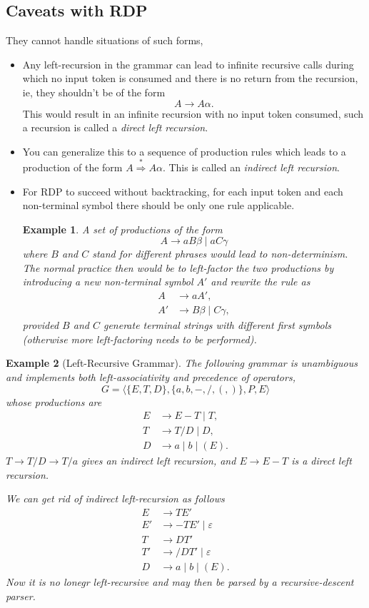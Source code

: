 \documentclass[a4paper]{scrartcl}
\newtheorem*{example}{Example}
\theoremstyle{definition}
\newcommand{\eps}{\varepsilon}
\begin{document}
\subsection{Caveats with RDP}
They cannot handle situations of such forms,
\begin{itemize}
	\item Any left-recursion in the grammar can lead to infinite recursive calls during which no input token is consumed and there is no return from the recursion, ie, they shouldn't be of the form
\[A \to A \alpha.\]
This would result in an infinite recursion with no input token consumed, such a recursion is called a \emph{direct left recursion}.
	\item You can generalize this to a sequence of production rules which leads to a production of the form $A \stackrel{*}{\Rightarrow} A \alpha$. This is called an \emph{indirect left recursion}.
	\item For RDP to succeed without backtracking, for each input token and each non-terminal symbol there should be only one rule applicable.

	\begin{example}
		A set of productions of the form
		\[A \to a B \beta \mid a C \gamma\]
		where $B$ and $C$ stand for different phrases would lead to non-determinism. The normal practice then would be to \emph{left-factor} the two productions by introducing a new non-terminal symbol $A'$ and rewrite the rule as
		\begin{align*}
			A &\to a A',\\
			A' &\to B\beta \mid C\gamma,
		\end{align*}
		provided $B$ and $C$ generate terminal strings with different first symbols (otherwise more left-factoring needs to be performed).
	\end{example}
\end{itemize}

\begin{example}[Left-Recursive Grammar]
	The following grammar is unambiguous and implements both left-associativity and precedence of operators,
	\[G = \langle \{E, T, D\}, \{a, b, -, /, (, )\}, P, E\rangle\]
	whose productions are
	\begin{align*}
		E &\to E - T \mid T,\\
		T &\to T / D \mid D,\\
		D &\to a \mid b \mid (E).
	\end{align*}
	$T \to T / D \to T / a$ gives an indirect left recursion, and $E \to E - T$ is a direct left recursion.

	We can get rid of indirect left-recursion as follows
	\begin{align*}
		E &\to T E'\\
		E' &\to -TE' \mid \eps\\
		T &\to D T'\\
		T' &\to /DT' \mid \eps\\
		D &\to a \mid b \mid (E).
	\end{align*}
	Now it is no lonegr left-recursive and may then be parsed by a recursive-descent parser.
\end{example}
\end{document}

